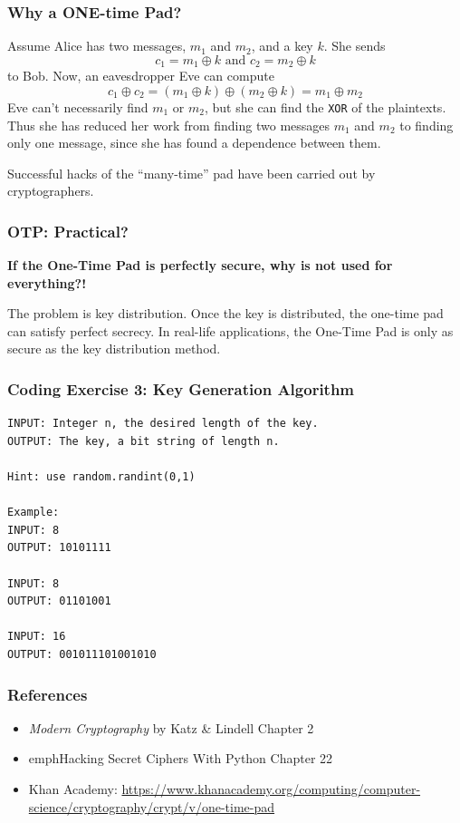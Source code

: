 \documentclass{beamer}
\newcommand{\<}{\langle}
\renewcommand{\>}{\rangle}
\begin{document}
\begin{frame}[fragile]
\frametitle{Why a ONE-time Pad?}

Assume Alice has two messages, $m_1$ and $m_2$, and a key $k$. She sends
\[
c_1 = m_1 \oplus k \text{ and } c_2 = m_2 \oplus k
\]
to Bob. Now, an eavesdropper Eve can compute 
\[
c_1 \oplus c_2 = (m_1\oplus k) \oplus (m_2\oplus k) = m_1 \oplus m_2
\]
Eve can't necessarily find $m_1$ or $m_2$, but she can find the \verb|XOR| of the plaintexts. Thus she has reduced her work from finding two messages $m_1$ and $m_2$ to finding only one message, since she has found a dependence between them.\newline

Successful hacks of the ``many-time'' pad have been carried out by cryptographers. 
\end{frame}


\begin{frame}
\frametitle{OTP: Practical?}

\textbf{If the One-Time Pad is perfectly secure, why is not used for everything?!}\newline

\pause

The problem is key distribution. Once the key is distributed, the one-time pad can satisfy perfect secrecy. In real-life applications, the One-Time Pad is only as secure as the key distribution method. 
\end{frame}


\begin{frame}[fragile]
\frametitle{Coding Exercise 3: Key Generation Algorithm}

\begin{verbatim}
INPUT: Integer n, the desired length of the key.
OUTPUT: The key, a bit string of length n. 

Hint: use random.randint(0,1)

Example:
INPUT: 8
OUTPUT: 10101111

INPUT: 8
OUTPUT: 01101001

INPUT: 16
OUTPUT: 001011101001010
\end{verbatim}
\end{frame}

\begin{frame}
\frametitle{References}

\begin{itemize}
\item \emph{Modern Cryptography} by Katz \& Lindell Chapter 2
\item emph{Hacking Secret Ciphers With Python} Chapter 22
\item Khan Academy: \url{https://www.khanacademy.org/computing/computer-science/cryptography/crypt/v/one-time-pad}
\end{itemize}
\end{frame}
\end{document}

